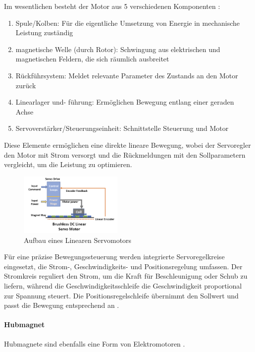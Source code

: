 Im wesentlichen besteht der Motor aus 5 verschiedenen Komponenten \cite*[vgl.][]{Linearer.Servo}:

\begin{enumerate}
	\item Spule/Kolben: Für die eigentliche Umsetzung von Energie in mechanische Leistung zuständig
	\item magnetische Welle (durch Rotor): Schwingung aus elektrischen und magnetischen Feldern, die sich räumlich ausbreitet
	\item Rückführsystem: Meldet relevante Parameter des Zustands an den Motor zurück
	\item Linearlager und- führung: Ermöglichen Bewegung entlang einer geraden Achse
	\item Servoverstärker/Steuerungseinheit: Schnittstelle Steuerung und Motor
\end{enumerate}

Diese Elemente ermöglichen eine direkte lineare Bewegung,
wobei der Servoregler den Motor mit Strom versorgt und die Rückmeldungen mit den Sollparametern vergleicht,
um die Leistung zu optimieren.

\begin{figure}[htbp]
	\centering
	\includegraphics[width=5cm]{img/BrushlessDCLin}
	\caption{Aufbau eines Linearen Servomotors \cite*{Linearer.Servo}}
	\label{fig:ServomotorAufbau}
\end{figure}

Für eine präzise Bewegungssteuerung werden integrierte Servoregelkreise eingesetzt, die Strom-, Geschwindigkeits- und
Positionsregelung umfassen. Der Stromkreis reguliert den Strom, um die Kraft für Beschleunigung oder Schub zu liefern,
während die Geschwindigkeitsschleife die Geschwindigkeit proportional zur Spannung steuert. Die Positionsregelschleife
übernimmt den Sollwert und passt die Bewegung entsprechend an \cite*[vgl.][]{Linearer.Servo}.

\paragraph{Hubmagnet}
Hubmagnete sind ebenfalls eine Form von Elektromotoren \cite*[vgl.][Kapitel 1-2]{SolenoidDesign}.

